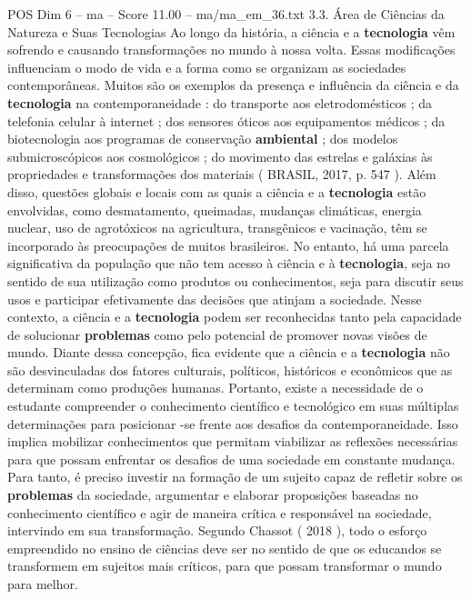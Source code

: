 \begin{textsample}{POS Dim 6 – ma – Score 11.00 – ma/ma\_em\_36.txt}  \label{ex:f6_pos_093}
3.3.
Área de Ciências da Natureza e Suas Tecnologias Ao longo da história, a ciência e a \textbf{tecnologia} vêm sofrendo e causando transformações no mundo à nossa volta.
Essas modificações influenciam o modo de vida e a forma como se organizam as sociedades contemporâneas.
Muitos são os exemplos da presença e influência da ciência e da \textbf{tecnologia} na contemporaneidade : do transporte aos eletrodomésticos ; da telefonia celular à internet ; dos sensores óticos aos equipamentos médicos ; da biotecnologia aos programas de conservação \textbf{ambiental} ; dos modelos submicroscópicos aos cosmológicos ; do movimento das estrelas e galáxias às propriedades e transformações dos materiais ( BRASIL, 2017, p. 547 ).
Além disso, questões globais e locais com as quais a ciência e a \textbf{tecnologia} estão envolvidas, como desmatamento, queimadas, mudanças climáticas, energia nuclear, uso de agrotóxicos na agricultura, transgênicos e vacinação, têm se incorporado às preocupações de muitos brasileiros.
No entanto, há uma parcela significativa da população que não tem acesso à ciência e à \textbf{tecnologia}, seja no sentido de sua utilização como produtos ou conhecimentos, seja para discutir seus usos e participar efetivamente das decisões que atinjam a sociedade.
Nesse contexto, a ciência e a \textbf{tecnologia} podem ser reconhecidas tanto pela capacidade de solucionar \textbf{problemas} como pelo potencial de promover novas visões de mundo.
Diante dessa concepção, fica evidente que a ciência e a \textbf{tecnologia} não são desvinculadas dos fatores culturais, políticos, históricos e econômicos que as determinam como produções humanas.
Portanto, existe a necessidade de o estudante compreender o conhecimento científico e tecnológico em suas múltiplas determinações para posicionar -se frente aos desafios da contemporaneidade.
Isso implica mobilizar conhecimentos que permitam viabilizar as reflexões necessárias para que possam enfrentar os desafios de uma sociedade em constante mudança.
Para tanto, é preciso investir na formação de um sujeito capaz de refletir sobre os \textbf{problemas} da sociedade, argumentar e elaborar proposições baseadas no conhecimento científico e agir de maneira crítica e responsável na sociedade, intervindo em sua transformação.
Segundo Chassot ( 2018 ), todo o esforço empreendido no ensino de ciências deve ser no sentido de que os educandos se transformem em sujeitos mais críticos, para que possam transformar o mundo para melhor.

\end{textsample}
